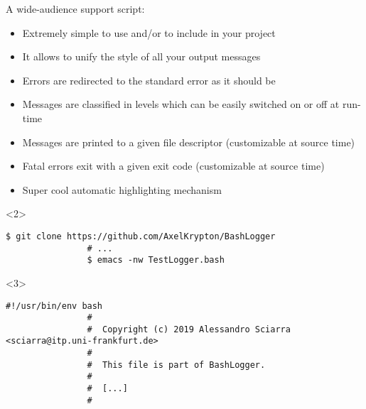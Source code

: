 \begin{frame}[fragile]{A wide-audience support script: }
    \vspace{-2mm}
    \begin{overlayarea}{\textwidth}{0.8\textheight}
        \begin{itemize}[<only@1-2>]
            \setlength{\itemsep}{4pt}
            \item Extremely simple to use and/or to include in your project
            \item It allows to unify the style of all your output messages
            \item Errors are redirected to the standard error as it should be
            \item Messages are classified in levels which can be easily switched on or off at run-time
            \item Messages are printed to a given file descriptor (customizable at source time)\\
            \item Fatal errors exit with a given exit code (customizable at source time)\\
            \item Super cool automatic highlighting mechanism
        \end{itemize}
        \begin{onlyenv}<2>
            \begin{lstlisting}[style=myBash, aboveskip=3mm, numbers=none]
                $ git clone https://github.com/AxelKrypton/BashLogger
                # ...
                $ emacs -nw TestLogger.bash
            \end{lstlisting}
        \end{onlyenv}
        \begin{onlyenv}<3>
            \begin{lstlisting}[style=myBash, aboveskip=0mm, numbers=none, style=smaller, xleftmargin=0mm, xrightmargin=0mm]
                #!/usr/bin/env bash
                #
                #  Copyright (c) 2019 Alessandro Sciarra <sciarra@itp.uni-frankfurt.de>
                #
                #  This file is part of BashLogger.
                #
                #  [...]
                #


\end{lstlisting}
\end{onlyenv}
\end{overlayarea}
\end{frame}

